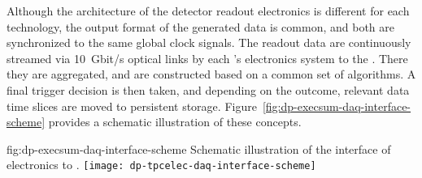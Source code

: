 Although the architecture of the detector readout electronics is different for each technology, the output format of the generated data is common, and both are synchronized to the same global clock signals. The readout data are continuously streamed via \SI{10}{Gbit/s}  optical links by each 's  electronics system to the . There they are aggregated, and  are constructed based on a common set of algorithms. A final trigger decision is then taken, and depending on the outcome, relevant data time slices are moved to persistent storage. Figure~\ref{fig:dp-execsum-daq-interface-scheme} provides a schematic illustration of these concepts. 
  

\begin{dunefigure}{fig:dp-execsum-daq-interface-scheme}
{Schematic illustration of the interface of   electronics to .}
\texttt{[image: dp-tpcelec-daq-interface-scheme]}
\end{dunefigure}

